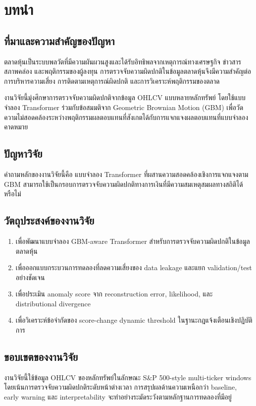 \chapter{บทนำ}

\section{ที่มาและความสำคัญของปัญหา}

ตลาดหุ้นเป็นระบบพลวัตที่มีความผันผวนสูงและได้รับอิทธิพลจากเหตุการณ์ทางเศรษฐกิจ ข่าวสาร สภาพคล่อง และพฤติกรรมของผู้ลงทุน การตรวจจับความผิดปกติในข้อมูลตลาดหุ้นจึงมีความสำคัญต่อการบริหารความเสี่ยง การติดตามเหตุการณ์ผิดปกติ และการวิเคราะห์พฤติกรรมของตลาด

งานวิจัยนี้มุ่งศึกษาการตรวจจับความผิดปกติจากข้อมูล OHLCV แบบหลายหลักทรัพย์ โดยใช้แบบจำลอง Transformer ร่วมกับข้อสมมติจาก Geometric Brownian Motion (GBM) เพื่อวัดความไม่สอดคล้องระหว่างพฤติกรรมผลตอบแทนที่สังเกตได้กับการแจกแจงผลตอบแทนที่แบบจำลองคาดหมาย

\section{ปัญหาวิจัย}

คำถามหลักของงานวิจัยนี้คือ แบบจำลอง Transformer ที่ผสานความสอดคล้องเชิงการแจกแจงตาม GBM สามารถใช้เป็นกรอบการตรวจจับความผิดปกติทางการเงินที่มีความสมเหตุสมผลทางสถิติได้หรือไม่

\section{วัตถุประสงค์ของงานวิจัย}

\begin{enumerate}
  \item เพื่อพัฒนาแบบจำลอง GBM-aware Transformer สำหรับการตรวจจับความผิดปกติในข้อมูลตลาดหุ้น
  \item เพื่อออกแบบกระบวนการทดลองที่ลดความเสี่ยงของ data leakage และแยก validation/test อย่างชัดเจน
  \item เพื่อประเมิน anomaly score จาก reconstruction error, likelihood, และ distributional divergence
  \item เพื่อวิเคราะห์ข้อจำกัดของ score-change dynamic threshold ในฐานะกฎแจ้งเตือนเชิงปฏิบัติการ
\end{enumerate}

\section{ขอบเขตของงานวิจัย}

งานวิจัยนี้ใช้ข้อมูล OHLCV ของหลักทรัพย์ในลักษณะ S\&P 500-style multi-ticker windows โดยเน้นการตรวจจับความผิดปกติระดับหน้าต่างเวลา การสรุปผลด้านความเหนือกว่า baseline, early warning และ interpretability จะทำอย่างระมัดระวังตามหลักฐานการทดลองที่มีอยู่

